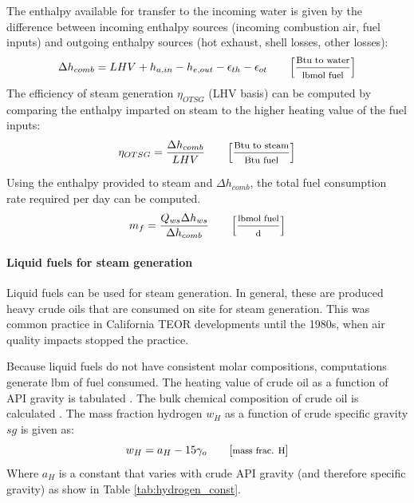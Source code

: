 \documentclass[11pt]{report}
\newcommand{\marg}[1]{{\footnotesize\textit{\textcolor{stanford}{'#1'}}}}
\newcommand{\marginnote}[1]{\marginpar{\marg{#1}}}
\begin{document}
The enthalpy available for transfer to the incoming water is given by the difference between incoming enthalpy sources (incoming combustion air, fuel inputs) and outgoing enthalpy sources (hot exhaust, shell losses, other losses):
\marginnote{Steam Generation 2.6.3}
\begin{equation}\label{eq:steam_hcomb}
\Delta h_{comb} = LHV+ h_{a,in} - h_{e,out} - \epsilon_{th} - \epsilon_{ot} \quad\quad \footnotesize{\left[\frac{\text{Btu to water}}{\text{lbmol fuel}}\right]}
\end{equation}
The efficiency of steam generation $\eta_{OTSG}$ (LHV basis) can be computed by comparing the enthalpy imparted on steam to the higher heating value of the fuel inputs:
\marginnote{Steam Generation 2.2.7.4}
\begin{equation}\label{eq:steam_OTSG_eff}
\eta_{OTSG} = \frac{\Delta h_{comb}}{LHV} \quad\quad \footnotesize{\left[\frac{\text{Btu to steam}}{\text{Btu fuel}}\right]}
\end{equation}

Using the enthalpy provided to steam and $\Delta h_{comb}$, the total fuel consumption rate required per day can be computed.
\marginnote{Steam Generation 2.2.8.1}
\begin{equation}\label{eq:steam_mfuel}
m_{f} = \frac{Q_{ws} \Delta h_{ws}}{\Delta h_{comb}} \quad\quad \footnotesize{\left[\frac{\text{lbmol fuel}}{\text{d}}\right]}
\end{equation}

\paragraph{Liquid fuels for steam generation}
Liquid fuels can be used for steam generation. In general, these are produced heavy crude oils that are consumed on site for steam generation. This was common practice in California TEOR developments until the 1980s, when air quality impacts stopped the practice.

Because liquid fuels do not have consistent molar compositions, computations generate lbm of fuel consumed. The heating value of crude oil as a function of \marginnote{Fuel Specs \\Table 1.1} API gravity is tabulated \cite{Schmidt1985}. The bulk chemical composition of crude oil is calculated \cite[p. 41]{Schmidt1985}. The mass fraction hydrogen $w_H$ as a function of crude specific gravity $sg$ is given as:
\marginnote{Fuel Specs \\ Table 1.2}
\begin{equation}\label{eq:steam_wh}
w_H = a_H - 15 \gamma_o \quad\quad \footnotesize{\left[ \text{mass frac. H}\right]}
\end{equation}
Where $a_H$ is a constant that varies with crude API gravity (and therefore specific gravity) as show in Table \ref{tab:hydrogen_const}.
\end{document}
